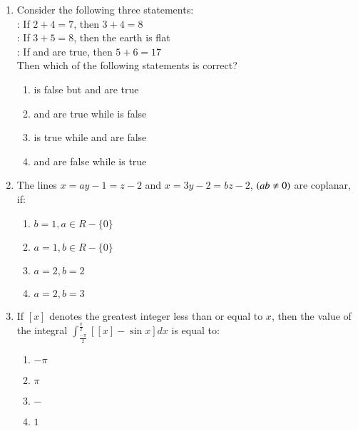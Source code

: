 \documentclass[journal]{IEEEtran}
\begin{document}
\begin{enumerate}
    \item Consider the following three statements:\\
    : If $2+4=7$, then $3+4=8$\\
    : If $3+5=8$, then the earth is flat\\
    : If  and  are true, then $5+6=17$\\
    Then which of the following statements is correct?

		\begin{multicols}{2}
			\begin{enumerate}
				\item {} is false but  and  are true
                    \item {} and  are true while  is false
                    \item {} is true while  and  are false
                    \item {} and  are false while  is true
			\end{enumerate}
		\end{multicols}

    \item The lines $x=ay-1=z-2$ and $x=3y-2=bz-2$, $\left(ab\neq 0\right)$ are coplanar, if:

		\begin{multicols}{4}
			\begin{enumerate}
				\item $b=1, a\in R-\{0\}$
				\item $a=1, b\in R-\{0\}$
				\item $a=2,b=2$
				\item $a=2,b=3$
			\end{enumerate}
		\end{multicols}

    \item If $\left[x\right]$ denotes the greatest integer less than or equal to $x$, then the value of the integral $\int_{\frac{-\pi}{2}}^{\frac{\pi}{2}}\left[\left[x\right]-\sin x\right]dx$ is equal to:
    
        \begin{multicols}{4}
            \begin{enumerate}
                \item $-\pi$
                \item $\pi$
                \item $-$
                \item $1$
            \end{enumerate}
        \end{multicols}


\end{enumerate}
\end{document}
